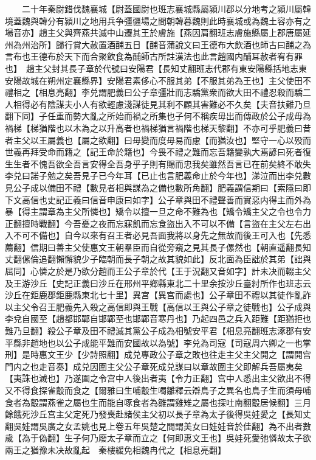 　　二十年秦尉錯伐魏襄城【尉蓋國尉也班志襄城縣屬潁川郡以分地考之潁川屬韓境蓋魏與韓分有潁川之地用兵争彊疆場之間朝韓暮魏則此時襄城或為魏土容亦有之場音亦】趙主父與齊燕共滅中山遷其王於膚施【燕因肩翻班志膚施縣屬上郡唐屬延州為州治所】歸行賞大赦置酒酺五日【酺音蒲說文曰王德布大飲酒也師古曰酺之為言布也王德布於天下而合聚飲食為酺師古所註漢法也此言趙國内酺耳赦者宥有罪也】　趙主父封其長子章於代號曰安陽君【長知丈翻班志代郡有東安陽縣括地志東安陽故城在朔州定襄縣界】安陽君素侈心不服其弟【不服其弟為王也】主父使田不禮相之【相息亮翻】李兑謂肥義曰公子章彊壯而志驕黨衆而欲大田不禮忍殺而驕二人相得必有陰謀夫小人有欲輕慮淺謀徒見其利不顧其害難必不久矣【夫音扶難乃旦翻下同】子任重而勢大亂之所始而禍之所集也子何不稱疾毋出而傳政於公子成毋為禍梯【梯猶階也以木為之以升高者也禍梯猶言禍階也梯天黎翻】不亦可乎肥義曰昔者主父以王屬義也【屬之欲翻】曰毋變而度毋易而慮【而猶汝也】堅守一心以殁而世義再拜受命而籍之【記王命於籍也】今畏不禮之難而忘吾籍變孰大焉諺曰死者復生生者不愧吾欲全吾言安得全吾身乎子則有賜而忠我矣雖然吾言已在前矣終不敢失李兑曰諾子勉之矣吾見子已今年耳【已止也言肥義命止於今年也】涕泣而出李兑數見公子成以備田不禮【數見者相與謀為之備也數所角翻】肥義謂信期曰【索隱曰即下文高信也史記正義曰信音申康曰如字】公子章與田不禮聲善而實惡内得主而外為暴【得主謂章為主父所憐也】矯令以擅一旦之命不難為也【矯令矯主父之令也令力正翻擅時戰翻】今吾憂之夜而忘寐飢而忘食盜出入不可以不備【言盜在主父左右出入不可不備也】自今以來有召王者必見吾面我將以身先之無故而後王可入也【先悉薦翻】信期曰善主父使惠文王朝羣臣而自從旁窺之見其長子傫然也【朝直遥翻長知丈翻傫倫追翻懶懈貌少子臨朝而長子朝之故其貌如此】反北面為臣詘於其弟【詘與屈同】心憐之於是乃欲分趙而王公子章於代【王于況翻又音如字】計未决而輟主父及王游沙丘【史記正義曰沙丘在邢州平鄉縣東北二十里余按沙丘臺紂所作也班志云沙丘在鉅鹿郡鉅鹿縣東北七十里】異宫【異宫而處也】公子章田不禮以其徒作亂詐以主父令召王肥義先入殺之高信即與王戰【高信以王與公子章之徒戰也】公子成與李兌自國至【趙都邯鄲自邯鄲至也邯鄲音寒丹也】乃起四邑之兵入距難【距猶拒也難乃旦翻】殺公子章及田不禮滅其黨公子成為相號安平君【相息亮翻班志涿郡有安平縣非趙地也以公子成能平難而安國故以為號】李兑為司寇【司寇周六卿之一也掌刑】是時惠文王少【少詩照翻】成兑專政公子章之敗也往走主父主父開之【謂開宫門内之也走音奏】成兑因圍主父公子章死成兑謀曰以章故圍主父即解兵吾屬夷矣【夷誅也滅也】乃遂圍之令宫中人後出者夷【令力正翻】宫中人悉出主父欲出不得又不得食探雀鷇而食之【爾雅曰生哺鷇生噣雛釋云辯鳥子之異名也鳥子生而須母哺食者為鷇謂燕雀之屬也生而能自啄食者為雛謂雞雉之屬也探吐南翻鷇居候翻】三月餘餓死沙丘宫主父定死乃發喪赴諸侯主父初以長子章為太子後得吳娃愛之【長知丈翻吳娃謂吳廣之女孟姚也見上卷五年吳楚之間謂美女曰娃娃音於佳翻】為不出者數歲【為于偽翻】生子何乃廢太子章而立之【何即惠文王也】吳娃死愛弛憐故太子欲兩王之猶豫未决故亂起　秦樓緩免相魏冉代之【相息亮翻】

